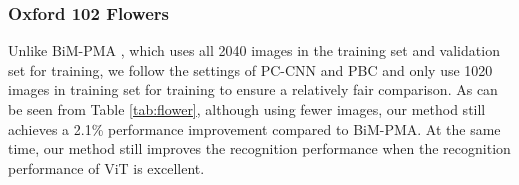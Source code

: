 \documentclass[5p,twocolumn]{elsarticle}
\begin{document}
\begin{table}[h]
\centering
\caption{Comparison results on Stanford Dog dataset.}
\label{tab:dog}
\end{table}

\subsubsection{\textbf{Oxford 102 Flowers}}
Unlike BiM-PMA \cite{Song2020Bi}, which uses all 2040 images in the training set and validation set for training, we follow the settings of PC-CNN \cite{Dubey2018Pairwise} and PBC \cite{Huang2017PBC} and only use 1020 images in training set for training to ensure a relatively fair comparison.  As can be seen from Table \ref{tab:flower}, although using fewer images, our method still achieves a 2.1\% performance improvement compared to BiM-PMA. At the same time, our method still improves the recognition performance when the recognition performance of ViT is excellent. 
\end{document}
